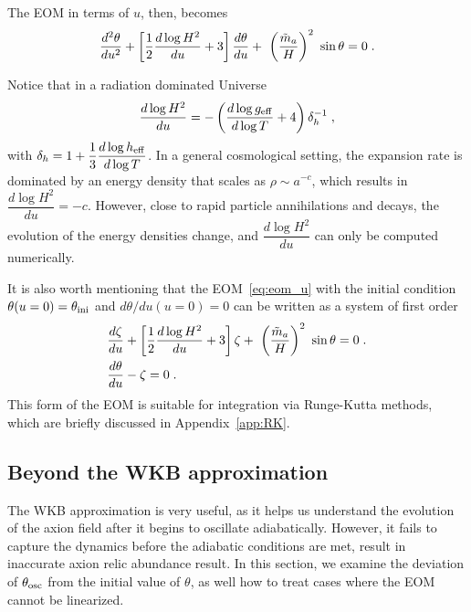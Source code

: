 \documentclass[11pt,a4paper]{article}
\begin{document}
The EOM in terms of $u$, then, becomes
%
\begin{equation}
	\dfrac{d^2  \theta}{du^2} + \left[ \dfrac{1}{2} \dfrac{d \log H^2}{du} + 3  \right] \dfrac{d  \theta}{d u} + \ \left( \dfrac{\tilde m_{a}{}}{H} \right)^2 \ \sin \theta
	=0 \;.
	\label{eq:eom_u}
\end{equation}

Notice that in a radiation dominated Universe
%
$$
\dfrac{d \log H^2}{du} = -\left(  \dfrac{d \log g_{\rm eff}{}}{d \log T} +4  \right) \delta_h^{-1}\;,
$$
with  $ \delta_h = 1+ \dfrac{1}{3} \dfrac{d \log h_{\rm eff}{}}{d \log T} $. 
%
In a general cosmological setting, the expansion rate is dominated by an energy density that scales as $\rho \sim a^{-c}$, which results in $\dfrac{d \log H^2}{du}  = -c$. However, close to rapid particle annihilations and decays, the evolution of the energy densities change, and $\dfrac{d \log H^2}{du}$ can only be computed numerically.

It is also worth mentioning that the EOM~\ref{eq:eom_u} with the initial condition $\theta(u=0)=\theta_{\rm ini}{}$ and $d\theta/du (u=0)=0$ can be written as a system of first order 
%
\begin{eqnarray}
& \dfrac{d  \zeta}{du} + \left[ \dfrac{1}{2} \dfrac{d \log H^2}{du} + 3  \right] \zeta + \ \left( \dfrac{\tilde m_{a}{}}{H} \right)^2 \ \sin \theta
=0 \;. \\ \nonumber
&\dfrac{d \theta}{d u} - \zeta=0 \;.
\label{eq:eom_sys}
\end{eqnarray}
%
This form of the EOM is suitable for integration via Runge-Kutta methods, which are briefly discussed in Appendix~\ref{app:RK}.


\subsection{Beyond the WKB approximation}\label{sec:beyond_WKB}
%
The WKB approximation is very useful, as it helps us understand the evolution of the axion field after it begins to oscillate adiabatically. However, it fails to capture the dynamics before the adiabatic conditions are met, result in inaccurate axion relic abundance result. In this section, we examine the deviation of $\theta_{\rm osc}{}$ from the initial value of $\theta$, as well how to treat cases where the EOM cannot be linearized.
\end{document}
